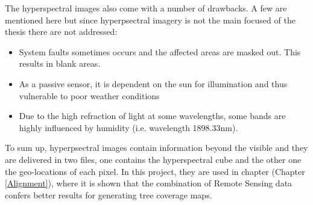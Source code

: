 \documentclass{subfiles}
\begin{document}
	The hyperspectral images also come with a number of drawbacks. A few are mentioned here but since hyperpsectral imagery is not the main focused of the thesis there are not addressed:
	\begin{itemize}
		\item System faults sometimes occurs and the affected areas are masked out. This results in blank areas. 
		\item As a passive sensor, it is dependent on the sun for illumination and thus vulnerable to poor weather conditions
		\item Due to the high refraction of light at some wavelengths, some bands are highly influenced by humidity (i.e. wavelength 1898.33nm).
	\end{itemize}
	
	To sum up, hyperpsectral images contain information beyond the visible and they are delivered in two files, one contains the hyperspectral cube and the other one the geo-locations of each pixel. In this project, they are used in chapter (Chapter \ref{Alignment}), where it is shown that the combination of Remote Sensing data confers better results for generating tree coverage maps. 
	
	
	
	
\end{document}

